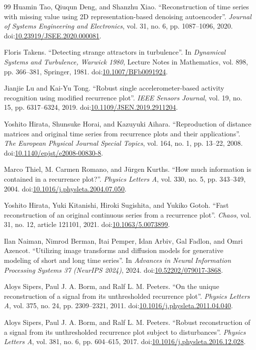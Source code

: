 \documentclass[preprint,review,12pt]{elsarticle}
\begin{document}
{\begin{thebibliography}{99}
Huamin Tao, Qiuqun Deng, and Shanzhu Xiao. ``Reconstruction of time series with missing value using 2D representation-based denoising autoencoder''. \textit{Journal of Systems Engineering and Electronics}, vol. 31, no. 6, pp. 1087--1096, 2020. doi:\url{10.23919/JSEE.2020.000081}.

Floris Takens. ``Detecting strange attractors in turbulence''. In \textit{Dynamical Systems and Turbulence, Warwick 1980}, Lecture Notes in Mathematics, vol. 898, pp. 366--381, Springer, 1981. doi:\url{10.1007/BFb0091924}.

Jianjie Lu and Kai-Yu Tong. ``Robust single accelerometer-based activity recognition using modified recurrence plot''. \textit{IEEE Sensors Journal}, vol. 19, no. 15, pp. 6317--6324, 2019. doi:\url{10.1109/JSEN.2019.2911204}.

Yoshito Hirata, Shunsuke Horai, and Kazuyuki Aihara. ``Reproduction of distance matrices and original time series from recurrence plots and their applications''. \textit{The European Physical Journal Special Topics}, vol. 164, no. 1, pp. 13--22, 2008. doi:\url{10.1140/epjst/e2008-00830-8}.

Marco Thiel, M. Carmen Romano, and Jürgen Kurths. ``How much information is contained in a recurrence plot?''. \textit{Physics Letters A}, vol. 330, no. 5, pp. 343--349, 2004. doi:\url{10.1016/j.physleta.2004.07.050}.

Yoshito Hirata, Yuki Kitanishi, Hiroki Sugishita, and Yukiko Gotoh. ``Fast reconstruction of an original continuous series from a recurrence plot''. \textit{Chaos}, vol. 31, no. 12, article 121101, 2021. doi:\url{10.1063/5.0073899}.

Ilan Naiman, Nimrod Berman, Itai Pemper, Idan Arbiv, Gal Fadlon, and Omri Azencot. ``Utilizing image transforms and diffusion models for generative modeling of short and long time series''. In \textit{Advances in Neural Information Processing Systems 37 (NeurIPS 2024)}, 2024. doi:\url{10.52202/079017-3868}.

Aloys Sipers, Paul J. A. Borm, and Ralf L. M. Peeters. ``On the unique reconstruction of a signal from its unthresholded recurrence plot''. \textit{Physics Letters A}, vol. 375, no. 24, pp. 2309--2321, 2011. doi:\url{10.1016/j.physleta.2011.04.040}.

Aloys Sipers, Paul J. A. Borm, and Ralf L. M. Peeters. ``Robust reconstruction of a signal from its unthresholded recurrence plot subject to disturbances''. \textit{Physics Letters A}, vol. 381, no. 6, pp. 604--615, 2017. doi:\url{10.1016/j.physleta.2016.12.028}.


\end{thebibliography}}
\end{document}
